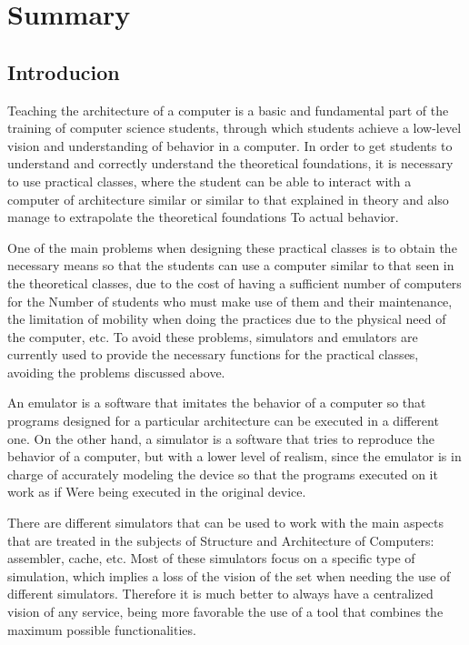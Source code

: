 \chead[]{}
\renewcommand{\headrulewidth}{0.5pt}

\lfoot[]{}
\cfoot[]{}
\rfoot[]{}
\renewcommand{\footrulewidth}{0pt}

\chapter{Summary}

\section{Introducion}

Teaching the architecture of a computer is a basic and fundamental part of the training of computer science students, through which students achieve a low-level vision and understanding of behavior in a computer. In order to get students to understand and correctly understand the theoretical foundations, it is necessary to use practical classes, where the student can be able to interact with a computer of architecture similar or similar to that explained in theory and also manage to extrapolate the theoretical foundations To actual behavior.

One of the main problems when designing these practical classes is to obtain the necessary means so that the students can use a computer similar to that seen in the theoretical classes, due to the cost of having a sufficient number of computers for the Number of students who must make use of them and their maintenance, the limitation of mobility when doing the practices due to the physical need of the computer, etc. To avoid these problems, simulators and emulators are currently used to provide the necessary functions for the practical classes, avoiding the problems discussed above.

An emulator is a software that imitates the behavior of a computer so that programs designed for a particular architecture can be executed in a different one. On the other hand, a simulator is a software that tries to reproduce the behavior of a computer, but with a lower level of realism, since the emulator is in charge of accurately modeling the device so that the programs executed on it work as if Were being executed in the original device.

There are different simulators that can be used to work with the main aspects that are treated in the subjects of Structure and Architecture of Computers: assembler, cache, etc. Most of these simulators focus on a specific type of simulation, which implies a loss of the vision of the set when needing the use of different simulators. Therefore it is much better to always have a centralized vision of any service, being more favorable the use of a tool that combines the maximum possible functionalities.

